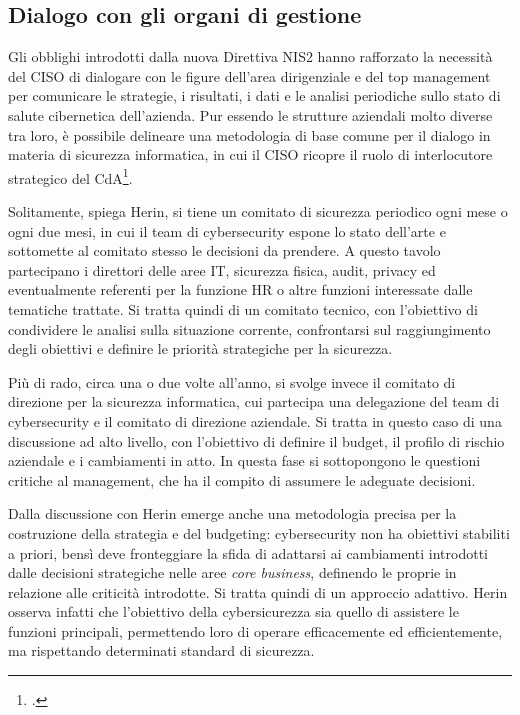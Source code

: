 \subsection{Dialogo con gli organi di gestione}
Gli obblighi introdotti dalla nuova Direttiva NIS2 hanno rafforzato la necessità del CISO di dialogare
con le figure dell'area dirigenziale e del top management per comunicare le strategie,
i risultati, i dati e le analisi periodiche sullo stato di salute cibernetica dell'azienda.
Pur essendo le strutture aziendali molto diverse tra loro, è possibile delineare una
metodologia di base comune per il dialogo in materia di sicurezza informatica, in cui
il CISO ricopre il ruolo di interlocutore strategico del CdA\footcite[pp. 25--38]{kouns-ciso}.

Solitamente, spiega Herin, si tiene un comitato di sicurezza periodico ogni
mese o ogni due mesi, in cui il team di cybersecurity espone lo stato dell'arte
e sottomette al comitato stesso le decisioni da prendere. A questo tavolo partecipano 
i direttori delle aree IT, sicurezza fisica, audit, privacy ed eventualmente
referenti per la funzione HR o altre funzioni interessate dalle tematiche trattate.
Si tratta quindi di un comitato tecnico, con l'obiettivo di condividere le analisi
sulla situazione corrente, confrontarsi sul raggiungimento degli obiettivi e 
definire le priorità strategiche per la sicurezza.

Più di rado, circa una o due volte all'anno, si svolge invece il comitato di direzione
per la sicurezza informatica, cui partecipa una delegazione del team di cybersecurity 
e il comitato di direzione aziendale. Si tratta in questo caso di una discussione
ad alto livello, con l'obiettivo di definire il budget, il profilo di rischio
aziendale e i cambiamenti in atto. In questa fase si sottopongono le 
questioni critiche al management, che ha il compito di assumere le adeguate decisioni.

Dalla discussione con Herin emerge anche una metodologia precisa per la costruzione
della strategia e del budgeting: cybersecurity non ha obiettivi stabiliti a priori, 
bensì deve fronteggiare la sfida di adattarsi ai cambiamenti introdotti dalle decisioni strategiche 
nelle aree \textit{core business}, definendo le proprie in relazione alle criticità introdotte.
Si tratta quindi di un approccio adattivo. Herin osserva infatti che l'obiettivo della cybersicurezza 
sia quello di assistere le funzioni principali, permettendo loro di operare efficacemente
ed efficientemente, ma rispettando determinati standard di sicurezza.



